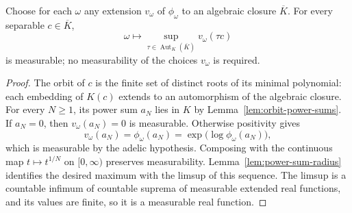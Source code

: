 \begin{lemma}\label{lem:orbit-maximum}
\leanok
{}
Choose for each $\omega$ any extension $v_\omega$ of $\phi_\omega$ to
an algebraic closure $\overline K$. For every separable $c\in\overline K$,
\[
 \omega\longmapsto
 \sup_{\tau\in\operatorname{Aut}_K(\overline K)}v_\omega(\tau c)
\]
is measurable; no measurability of the choices $v_\omega$ is required.
\end{lemma}
\begin{proof}
The orbit of $c$ is the finite set of distinct roots of its minimal
polynomial: each embedding of $K(c)$ extends to an automorphism of the
algebraic closure. For every $N\geq1$, its power sum $a_N$ lies in $K$
by Lemma~\ref{lem:orbit-power-sums}. If $a_N=0$, then
$v_\omega(a_N)=0$ is measurable. Otherwise positivity gives
\[
 v_\omega(a_N)=\phi_\omega(a_N)
 =\exp\bigl(\log\phi_\omega(a_N)\bigr),
\]
which is measurable by the adelic hypothesis. Composing with the continuous
map $t\mapsto t^{1/N}$ on $[0,\infty)$ preserves measurability.
Lemma~\ref{lem:power-sum-radius} identifies the desired maximum with
the limsup of this sequence. The limsup is a countable infimum of
countable suprema of measurable extended real functions, and its values
are finite, so it is a measurable real function.
\end{proof}

